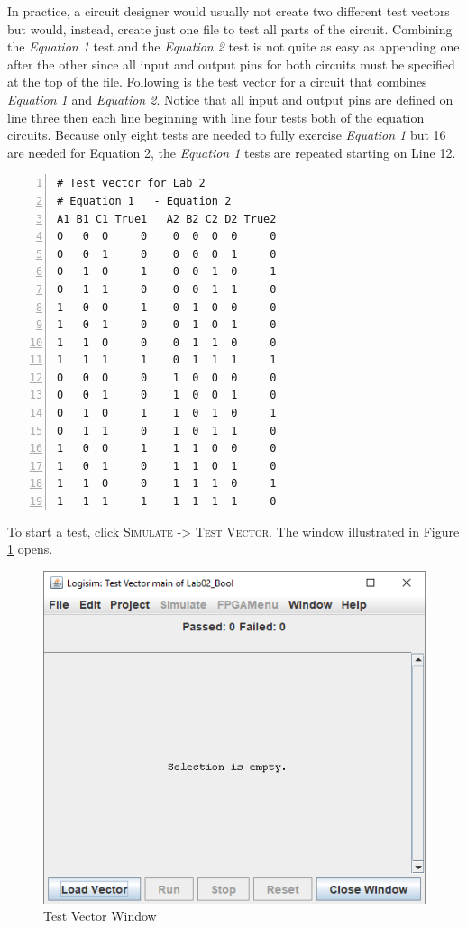 In practice, a circuit designer would usually not create two different test vectors but would, instead, create just one file to test all parts of the circuit. Combining the \textit{Equation 1} test and the \textit{Equation 2} test is not quite as easy as appending one after the other since all input and output pins for both circuits must be specified at the top of the file. Following is the test vector for a circuit that combines \textit{Equation 1} and \textit{Equation 2}. Notice that all input and output pins are defined on line three then each line beginning with line four tests both of the equation circuits. Because only eight tests are needed to fully exercise \textit{Equation 1} but 16 are needed for Equation 2, the \textit{Equation 1} tests are repeated starting on Line 12.

\begin{Verbatim}[frame=lines,
numbers=left,
xleftmargin=10mm,
xrightmargin=10mm]
# Test vector for Lab 2
# Equation 1   - Equation 2
A1 B1 C1 True1   A2 B2 C2 D2 True2
0   0  0     0    0  0  0  0     0
0   0  1     0    0  0  0  1     0
0   1  0     1    0  0  1  0     1
0   1  1     0    0  0  1  1     0
1   0  0     1    0  1  0  0     0
1   0  1     0    0  1  0  1     0
1   1  0     0    0  1  1  0     0
1   1  1     1    0  1  1  1     1
0   0  0     0    1  0  0  0     0
0   0  1     0    1  0  0  1     0
0   1  0     1    1  0  1  0     1
0   1  1     0    1  0  1  1     0
1   0  0     1    1  1  0  0     0
1   0  1     0    1  1  0  1     0
1   1  0     0    1  1  1  0     1
1   1  1     1    1  1  1  1     0
\end{Verbatim}

To start a test, click \textsc{Simulate -> Test Vector}. The window illustrated in Figure \ref{fig:add-06} opens. 

\begin{figure}[H]
	\centering
	\includegraphics[width=\maxwidth{.95\linewidth}]{gfx/add-06}
	\caption{Test Vector Window}
	\label{fig:add-06}
\end{figure}


